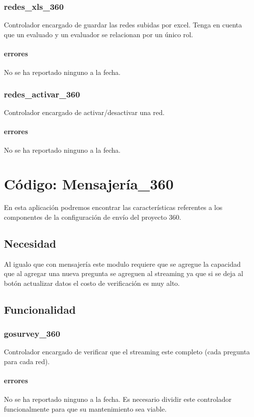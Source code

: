 \documentclass[10pt,a4paper]{book}
\begin{document}
	\subsection{redes\_xls\_360}
	Controlador encargado de guardar las redes subidas por excel. Tenga en cuenta que un evaluado y un evaluador se relacionan por un único rol.
	\subsubsection{errores}
	No se ha reportado ninguno a la fecha.
	
	\subsection{redes\_activar\_360}
	Controlador encargado de activar/desactivar una red.
	\subsubsection{errores}
	No se ha reportado ninguno a la fecha.


	\chapter{Código: Mensajería\_360}
	
	En esta aplicación podremos encontrar las características referentes a los componentes de la configuración de envío del proyecto 360.
	
	\section{Necesidad}
	Al igualo que con mensajería este modulo requiere que se agregue la capacidad que al agregar una nueva pregunta se agreguen al streaming ya que si se deja al botón actualizar datos el costo de verificación es muy alto.
	
	\section{Funcionalidad}


	\subsection{gosurvey\_360}
	Controlador encargado de verificar que el streaming este completo (cada pregunta para cada red).
	\subsubsection{errores}
	No se ha reportado ninguno a la fecha. Es necesario dividir este controlador funcionalmente para que su mantenimiento sea viable.
	
\end{document}
